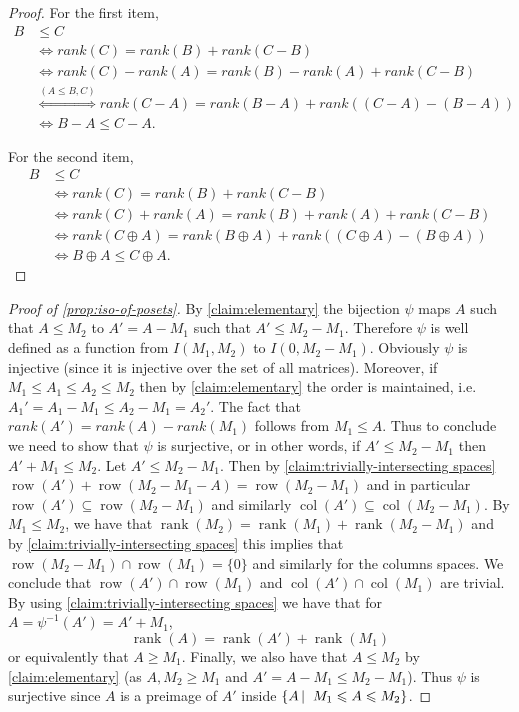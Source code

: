 \documentclass[10pt,a4paper]{article}
\newcommand{\prettyref}[1]{\cref{#1}}
\theoremstyle{definition}
\theoremstyle{remark}
\newcommand\sett[2]{\left\{ #1 \left| \; \vphantom{#1 #2} \right. #2  \right\}}
\newcommand{\set}[1]{\{#1\}}
\DeclareMathOperator{\rank}{rank}
\DeclareMathOperator{\row}{row}
\DeclareMathOperator{\col}{col}
\renewcommand{\leq}{\leqslant}
\renewcommand{\geq}{\geqslant}
\numberwithin{equation}{section}
\let\pref=\prettyref
\begin{document}
\begin{proof}
    For the first item,
    \begin{align*}
        B &\leq C \\
        &\Leftrightarrow rank(C) = rank(B) + rank(C-B) \\
        &\Leftrightarrow rank(C) - rank(A) = rank(B) - rank (A) + rank(C- B) \\
        &\overset{(A \leq B,C)}{\Leftrightarrow} rank (C-A) = rank(B-A) + rank((C-A) - (B-A)) \\
        &\Leftrightarrow B-A \leq C-A.
    \end{align*}

    For the second item,
    \begin{align*}
        B &\leq C \\
        &\Leftrightarrow rank(C) = rank(B) + rank(C-B) \\
        &\Leftrightarrow rank(C) + rank(A) = rank(B) + rank (A) + rank(C- B) \\
        &\Leftrightarrow rank (C \oplus A) = rank(B \oplus A) + rank((C\oplus A) - (B \oplus A)) \\
        &\Leftrightarrow B \oplus A \leq C \oplus A.
    \end{align*}
\end{proof}

\begin{proof}[Proof of \pref{prop:iso-of-posets}]
    By \pref{claim:elementary} the bijection \(\psi\) maps \(A\) such that \(A \leq M_2\) to \(A'=A- M_1\) such that \(A' \leq M_2 - M_1\). Therefore \(\psi\) is well defined as a function from \(I(M_1,M_2)\) to \(I(0,M_2-M_1)\). Obviously \(\psi\) is injective (since it is injective over the set of all matrices). Moreover, if \(M_1 \leq A_1 \leq A_2 \leq M_2\) then by \pref{claim:elementary} the order is maintained, i.e. \(A_1' = A_1 -M_1 \leq A_2 - M_1 = A_2'\). The fact that \(rank(A') = rank(A) - rank(M_1)\) follows from \(M_1 \leq A\). Thus to conclude we need to show that \(\psi\) is surjective, or in other words, if \(A' \leq M_2 - M_1\) then \(A' + M_1 \leq M_2\). Let \(A' \leq M_2 - M_1\). Then by \pref{claim:trivially-intersecting spaces}
    \(\row(A') + \row(M_2 -M_1 - A) = \row(M_2 - M_1)\) and in particular \(\row(A') \subseteq \row(M_2 - M_1)\) and similarly \(\col(A') \subseteq \col(M_2-M_1)\). By \(M_1 \leq M_2\), we have that \(\rank(M_2) = \rank(M_1) + \rank(M_2 - M_1)\) and by \pref{claim:trivially-intersecting spaces} this implies that \(\row(M_2-M_1) \cap \row(M_1) = \set{0}\) and similarly for the columns spaces. We conclude that \(\row(A') \cap \row(M_1)\) and \(\col(A') \cap \col(M_1)\) are trivial. By using \pref{claim:trivially-intersecting spaces} we have that for \(A = \psi^{-1}(A') = A' + M_1\),
    \[\rank(A) = \rank(A') + \rank(M_1)\]
    or equivalently that \(A \geq M_1\). Finally, we also have that \(A \leq M_2\) by \pref{claim:elementary} (as \(A,M_2 \geq M_1\) and \(A'=A-M_1 \leq M_2 - M_1\)). Thus \(\psi\) is surjective since \(A\) is a preimage of \(A'\) inside \(\sett{A}{M_1 \leq A \leq M_2}\).
\end{proof}
\end{document}
